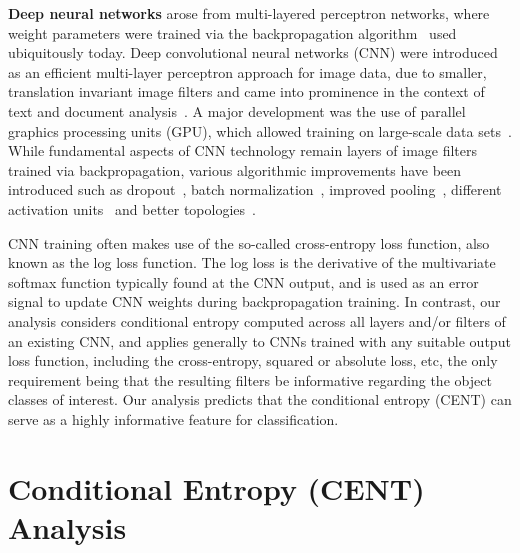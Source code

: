 \documentclass[10pt,onecolumn]{article}
\begin{document}
{\bf Deep neural networks} arose from multi-layered perceptron networks, where weight parameters were trained via the backpropagation algorithm~\cite{rosenblatt1961principles} used ubiquitously today. Deep convolutional neural networks (CNN) were introduced as an efficient multi-layer perceptron approach for image data, due to smaller, translation invariant image filters and came into prominence in the context of text and document analysis~\cite{lecun1989backpropagation,lecun1998gradient}.
A major development was the use of parallel graphics processing units (GPU), which allowed training on large-scale data sets~\cite{krizhevsky2012imagenet}. While fundamental aspects of CNN technology remain layers of image filters trained via backpropagation, various algorithmic improvements have been introduced such as dropout~\cite{sriva2014dropout}, batch normalization~\cite{sergey2015batch}, improved pooling~\cite{graham2014fractional}, different activation units~\cite{clevert2015fast} and better topologies~\cite{huang2016densely}.

CNN training often makes use of the so-called cross-entropy loss function, also known as the log loss function. The log loss is the derivative of the multivariate softmax function typically found at the CNN output, and is used as an error signal to update CNN weights during backpropagation training. In contrast, our analysis considers conditional entropy computed across all layers and/or filters of an existing CNN, and applies generally to CNNs trained with any suitable output loss function, including the cross-entropy, squared or absolute loss, etc, the only requirement being that the resulting filters be informative regarding the object classes of interest. Our analysis predicts that the conditional entropy (CENT) can serve as a highly informative feature for classification.


\section{Conditional Entropy (CENT) Analysis}
\end{document}
